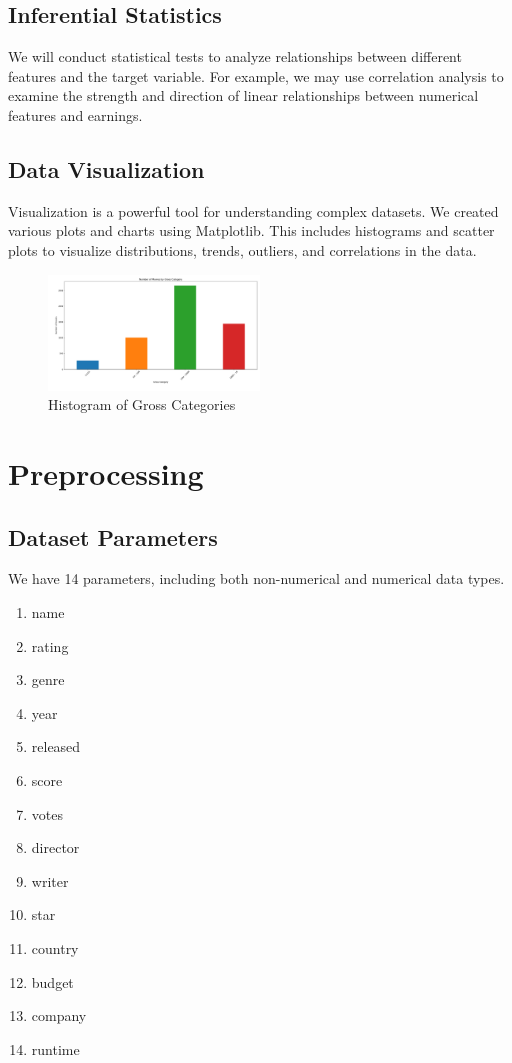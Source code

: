 \documentclass[conference]{IEEEtran}
\begin{document}
    \subsection{Inferential Statistics}
        We will conduct statistical tests to analyze relationships between different features and the target variable. For example, we may use correlation analysis to examine the strength and direction of linear relationships between numerical features and earnings.
    
    \subsection{Data Visualization}
        Visualization is a powerful tool for understanding complex datasets. We created various plots and charts using Matplotlib. This includes histograms and scatter plots to visualize distributions, trends, outliers, and correlations in the data.
        
        \begin{figure}[H]
            \centering
            \includegraphics[width=0.5\textwidth]{gross-histogram.png}
            \caption{Histogram of Gross Categories}
            \label{fig:gross-histogram}
        \end{figure}

\section{Preprocessing}
    \subsection{Dataset Parameters}
        We have 14 parameters, including both non-numerical and numerical data types.
        
        \begin{enumerate}
            \item name
            \item rating
            \item genre
            \item year
            \item released
            \item score
            \item votes
            \item director
            \item writer
            \item star
            \item country
            \item budget
            \item company
            \item runtime
        \end{enumerate}
        
\end{document}
